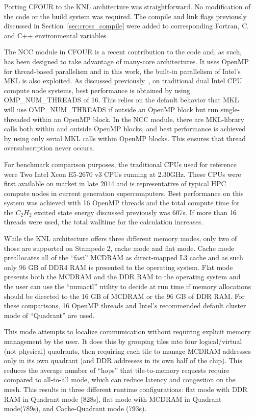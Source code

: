 Porting CFOUR to the KNL architecture was straightforward. No modification of the code or the build
system was required. The compile and link flags previously discussed in Section~\ref{sec:cross_compile}
were added to corresponding Fortran, C, and C++ environmental variables.

The NCC module in CFOUR is a recent contribution to the code and, as such, has been designed to take
advantage of many-core architectures. It uses OpenMP for thread-based parallelism and in this work, the
built-in parallelism of Intel's MKL is also exploited. As discussed previously~\cite{ncc:15},
on traditional dual Intel CPU compute node systems, best performance is obtained 
by using OMP\_NUM\_THREADS of 16. This relies on the default behavior that MKL will use OMP\_NUM\_THREADS 
if outside an OpenMP block but run single-threaded within an OpenMP block. 
In the NCC module, there are MKL-library calls both within and outside OpenMP blocks, and best performance is 
achieved by using only serial MKL calls within OpenMP blocks. This ensures that thread oversubscription never occurs.

For benchmark comparison purposes, the traditional CPUs used for reference were Two Intel Xeon E5-2670 v3 CPUs
running at 2.30GHz. These CPUs were first available on market in late 2014 and is representative of typical HPC 
compute nodes in current generation supercomputers. Best performance on this system was achieved with 
16 OpenMP threads and the total compute time for the $C_2H_2$ excited state energy discussed previously
was 607s.
If more than 16 threads were used, the total walltime for the calculation increases. 

While the KNL architecture offers three different memory modes, only two of those are supported on Stampede 2,
cache mode and flat mode. Cache mode preallocates all of the ``fast'' MCDRAM as direct-mapped L3 cache and
as such only 96 GB of DDR4 RAM is presented to the operating system. Flat mode presents both the MCDRAM and the 
DDR RAM to the operating system and the user can use the ``numactl'' utility to decide at run time if memory 
allocations should be directed to the 16 GB of MCDRAM or the 96 GB of DDR RAM. For these comparisons, 16 OpenMP
threads and Intel's recommended default cluster mode of ``Quadrant'' are used.

This mode attempts to localize communication without requiring explicit memory management by the user. 
It does this by grouping tiles into four logical/virtual (not physical) quadrants, then requiring each tile 
to manage MCDRAM addresses only in its own quadrant (and DDR addresses in its own half of the chip). 
This reduces the average number of ``hops'' that tile-to-memory requests require compared to all-to-all mode, 
which can reduce latency and congestion on the mesh. This results in three different runtime configurations:
flat mode with DDR RAM in Quadrant mode (828s), flat mode with MCDRAM in Quadrant mode(789s), and
Cache-Quadrant mode (793s). 

